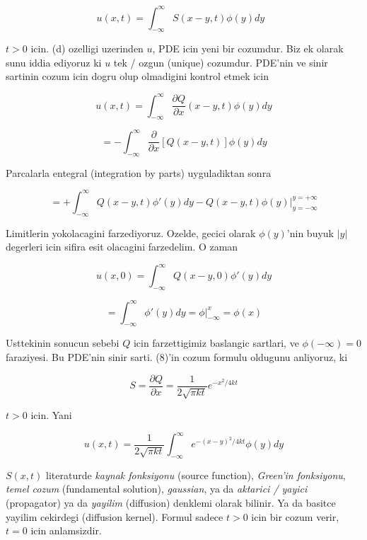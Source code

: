 \documentclass[12pt,fleqn]{article}\usepackage{../common}
\begin{document}
\[ u(x,t) = \int _{-\infty}^{\infty} S(x-y,t) \phi(y)dy 
\ \ \ \label{8}
\]

$t>0$ icin. (d) ozelligi uzerinden $u$, PDE icin yeni bir cozumdur. Biz ek
olarak sunu iddia ediyoruz ki $u$ tek / ozgun (unique) cozumdur. PDE'nin ve
sinir sartinin cozum icin dogru olup olmadigini kontrol etmek icin 

\[ u(x,t) = \int _{-\infty}^{\infty} 
\frac{\partial Q}{\partial x}(x-y,t)\phi(y)dy
\]

\[ = -\int _{-\infty}^{\infty} 
\frac{\partial }{\partial x}[Q(x-y,t)]\phi(y)dy
  \]

Parcalarla entegral (integration by parts) uyguladiktan sonra 

\[ 
=  + \int _{-\infty}^{\infty} 
Q(x-y,t)\phi'(y)dy - 
Q(x-y,t)\phi(y) \bigg| _{y=-\infty}^{y=+\infty}
  \]

Limitlerin yokolacagini farzediyoruz. Ozelde, gecici olarak $\phi(y)$'nin
buyuk $|y|$ degerleri icin sifira esit olacagini farzedelim. O zaman 

\[ u(x,0) = 
\int _{-\infty}^{\infty} Q(x-y, 0) \phi'(y)dy 
 \]

\[ 
= \int _{-\infty}^{\infty} \phi'(y)dy = \phi \bigg| _{-\infty}^{x} = \phi(x)
 \]

Usttekinin sonucun sebebi $Q$ icin farzettigimiz baslangic sartlari, ve
$\phi(-\infty) = 0$ faraziyesi. Bu PDE'nin sinir sarti. (8)'in cozum
formulu oldugunu anliyoruz, ki 

\[ S = \frac{\partial Q}{\partial x} = \frac{ 1}{2\sqrt{\pi kt}} 
e^{ -x^2 / 4kt}
\]

$t>0$ icin. Yani 

\[ u(x,t) = 
 \frac{ 1}{2\sqrt{\pi kt}} 
\int _{-\infty}^{\infty} e^{-(x-y)^2 / 4kt} \phi(y) dy
 \]

$S(x,t)$ literaturde {\em kaynak fonksiyonu} (source function), {\em Green'in
fonksiyonu}, {\em temel cozum} (fundamental solution), {\em gaussian}, ya
da {\em aktarici / yayici} (propagator) ya da {\em yayilim} (diffusion) denklemi
olarak bilinir. Ya da basitce yayilim cekirdegi (diffusion kernel). Formul
sadece $t>0$ icin bir cozum verir, $t=0$ icin anlamsizdir. 
\end{document}
